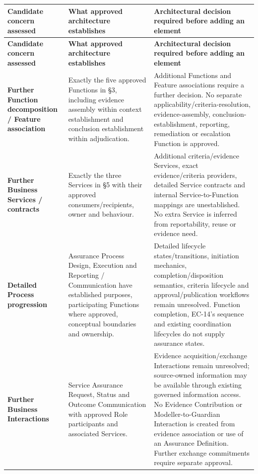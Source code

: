 \label{rad:assurance:218}
\begingroup\small\setlength{\TableWidth}{\dimexpr\linewidth-6\tabcolsep-4\arrayrulewidth\relax}
\begin{longtable}{|>{\raggedright\arraybackslash}p{0.24\TableWidth}|>{\raggedright\arraybackslash}p{0.33\TableWidth}|>{\raggedright\arraybackslash}p{0.43\TableWidth}|}
\hline\rowcolor{TableHead}\textbf{Candidate concern assessed} & \textbf{What approved architecture establishes} & \textbf{Architectural decision required before adding an element}\\\hline\endfirsthead
\hline\rowcolor{TableHead}\textbf{Candidate concern assessed} & \textbf{What approved architecture establishes} & \textbf{Architectural decision required before adding an element}\\\hline\endhead
\hline\endfoot
\textbf{Further Function decomposition /\allowbreak{} Feature association} & Exactly the five approved Functions in §3, including evidence assembly within context establishment and conclusion establishment within adjudication. & Additional Functions and Feature associations require a further decision. No separate applicability/\allowbreak{}criteria-resolution, evidence-assembly, conclusion-establishment, reporting, remediation or escalation Function is approved.\\\hline
\textbf{Further Business Services /\allowbreak{} contracts} & Exactly the three Services in §5 with their approved consumers/\allowbreak{}recipients, owner and behaviour. & Additional criteria/\allowbreak{}evidence Services, exact evidence/\allowbreak{}criteria providers, detailed Service contracts and internal Service-to-Function mappings are unestablished. No extra Service is inferred from reportability, reuse or evidence need.\\\hline
\textbf{Detailed Process progression} & Assurance Process Design, Execution and Reporting /\allowbreak{} Communication have established purposes, participating Functions where approved, conceptual boundaries and ownership. & Detailed lifecycle states/\allowbreak{}transitions, initiation mechanics, completion/\allowbreak{}disposition semantics, criteria lifecycle and approval/\allowbreak{}publication workflows remain unresolved. Function completion, EC-14's sequence and existing coordination lifecycles do not supply assurance states.\\\hline
\textbf{Further Business Interactions} & Service Assurance Request, Status and Outcome Communication with approved Role participants and associated Services. & Evidence acquisition/\allowbreak{}exchange Interactions remain unresolved; source-owned information may be available through existing governed information access. No Evidence Contribution or Modeller-to-Guardian Interaction is created from evidence association or use of an Assurance Definition. Further exchange commitments require separate approval.\\\hline

\end{longtable}
